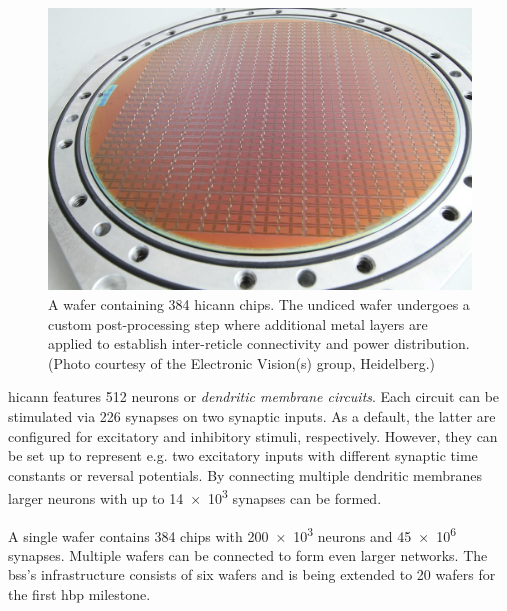 \begin{figure}
	\begin{center}
		\includegraphics[width=\columnwidth]{assets/wafer.jpg}
	\end{center}
	\caption{A wafer containing 384 \gls{hicann} chips. The undiced wafer undergoes a custom post-processing step where additional metal layers are applied to establish inter-reticle connectivity and power distribution. (Photo courtesy of the Electronic Vision(s) group, Heidelberg.)}
	\label{fig:wafer}
\end{figure}

\gls{hicann} features 512 neurons or \emph{dendritic membrane circuits}. Each
circuit can be stimulated via 226 synapses on two synaptic inputs. As a default,
the latter are configured for excitatory and inhibitory stimuli, respectively.
However, they can be set up to represent e.g. two excitatory inputs with
different synaptic time constants or reversal potentials. By connecting multiple
dendritic membranes larger neurons with up to \num{14e3} synapses can be formed.

A single wafer contains 384 chips with \num{200e3} neurons and \num{45e6} synapses. Multiple wafers can be connected to form even larger networks. The \gls{bss}'s infrastructure consists of six wafers and is being extended to 20 wafers for the first \gls{hbp} milestone.

%
%

